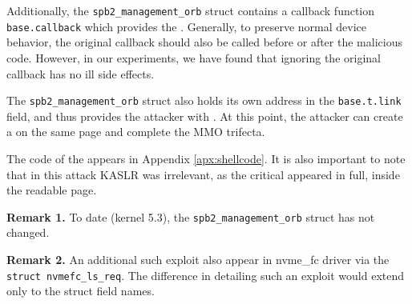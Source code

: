 Additionally, the \texttt{spb2\_management\_orb} struct contains a callback function \texttt{base.callback} which provides the \oportunity{}. Generally, to preserve normal device behavior, the original callback should also be called before or after the malicious code. However, in our experiments, we have found that ignoring the original callback has no ill side effects. 

The \texttt{spb2\_management\_orb} struct also holds its own address in the \texttt{base.t.link} field, and thus provides the attacker with \means{}. At this point, the attacker can create a \mabaf{} on the same page and complete the MMO trifecta. 

The code of the \mabaf{} appears in Appendix \ref{apx:shellcode}. It is also important to note that in this attack KASLR was irrelevant, as the critical \kva{} appeared in full, inside the readable page.

\smallskip
\noindent \textbf{Remark 1.} To date (kernel 5.3), the \texttt{spb2\_management\_orb} struct has not changed.

\smallskip
\noindent\textbf{Remark 2.} An additional such exploit also appear in nvme\_fc driver via the \texttt{struct nvmefc\_ls\_req}. The difference in detailing such an exploit would extend only to the struct field names.